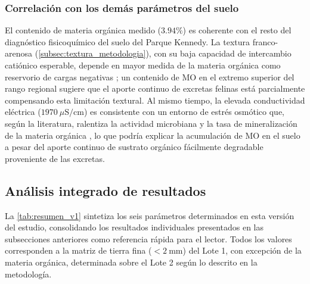 \documentclass[fleqn]{jaes}
\begin{document}
\subsubsection{Correlación con los demás parámetros del suelo}

El contenido de materia orgánica medido ($3.94\%$) es coherente con el resto del diagnóstico fisicoquímico del suelo del Parque Kennedy. La textura franco-arenosa (\cref{subsec:textura_metodologia}), con su baja capacidad de intercambio catiónico esperable, depende en mayor medida de la materia orgánica como reservorio de cargas negativas \cite{Bilen2025}; un contenido de MO en el extremo superior del rango regional sugiere que el aporte continuo de excretas felinas está parcialmente compensando esta limitación textural. Al mismo tiempo, la elevada conductividad eléctrica ($1970~\mu\text{S/cm}$) es consistente con un entorno de estrés osmótico que, según la literatura, ralentiza la actividad microbiana y la tasa de mineralización de la materia orgánica \cite{Rath2015, Setia2025}, lo que podría explicar la acumulación de MO en el suelo a pesar del aporte continuo de sustrato orgánico fácilmente degradable proveniente de las excretas.

\subsection{Análisis integrado de resultados}

La \cref{tab:resumen_v1} sintetiza los seis parámetros determinados en esta versión del estudio, consolidando los resultados individuales presentados en las subsecciones anteriores como referencia rápida para el lector. Todos los valores corresponden a la matriz de tierra fina ($<2~\text{mm}$) del Lote 1, con excepción de la materia orgánica, determinada sobre el Lote 2 según lo descrito en la metodología.
\end{document}
